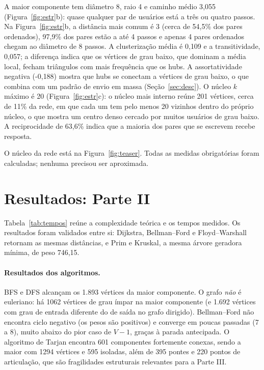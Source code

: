 \documentclass[sigconf]{webmedia}
\newcommand{\reciprocidade}{63{,}6\%}
\newcommand{\tamMaiorComp}{1.893}
\newcommand{\diametro}{8}
\newcommand{\raio}{4}
\newcommand{\caminhoMedio}{3{,}055}
\newcommand{\clustMedio}{0{,}109}
\newcommand{\transitividade}{0{,}057}
\newcommand{\coreMax}{20}
\newcommand{\assortatividade}{-0{,}188}
\newcommand{\nPontes}{395}
\newcommand{\nArticulacoes}{220}
\newcommand{\nSCC}{601}
\newcommand{\maiorSCC}{1294}
\newcommand{\grausImpares}{1062}
\newcommand{\pesoMST}{746{,}15}
\begin{document}
A maior componente tem diâmetro \diametro, raio \raio{} e caminho médio \caminhoMedio{} (Figura~\ref{fig:estr}b): quase qualquer par de usuários está a três ou quatro passos. Na Figura~\ref{fig:estr}b, a distância mais comum é 3 (cerca de 54,5\% dos pares ordenados), 97,9\% dos pares estão a até 4 passos e apenas 4 pares ordenados chegam ao diâmetro de \diametro{} passos. A clusterização média é \clustMedio{} e a transitividade, \transitividade{}; a diferença indica que os vértices de grau baixo, que dominam a média local, fecham triângulos com mais frequência que os hubs. A assortatividade negativa (\assortatividade{}) mostra que hubs se conectam a vértices de grau baixo, o que combina com um padrão de envio em massa (Seção~\ref{sec:desc}). O núcleo $k$ máximo é \coreMax{} (Figura~\ref{fig:estr}c): o núcleo mais interno reúne 201 vértices, cerca de 11\% da rede, em que cada um tem pelo menos 20 vizinhos dentro do próprio núcleo, o que mostra um centro denso cercado por muitos usuários de grau baixo. A reciprocidade de \reciprocidade{} indica que a maioria dos pares que se escrevem recebe resposta.

O núcleo da rede está na Figura~\ref{fig:teaser}. Todas as medidas obrigatórias foram calculadas; nenhuma precisou ser aproximada.

\FloatBarrier
\section{Resultados: Parte II}
Tabela~\ref{tab:tempos} reúne a complexidade teórica e os tempos medidos. Os resultados foram validados entre si: Dijkstra, Bellman--Ford e Floyd--Warshall retornam as mesmas distâncias, e Prim e Kruskal, a mesma árvore geradora mínima, de peso \pesoMST{}.

\paragraph{Resultados dos algoritmos.} BFS e DFS alcançam os \tamMaiorComp{} vértices da maior componente. O grafo \emph{não} é euleriano: há \grausImpares{} vértices de grau ímpar na maior componente (e 1.692 vértices com grau de entrada diferente do de saída no grafo dirigido). Bellman--Ford não encontra ciclo negativo (os pesos são positivos) e converge em poucas passadas (7 a 8), muito abaixo do pior caso de $V-1$, graças à parada antecipada. O algoritmo de Tarjan encontra \nSCC{} componentes fortemente conexas, sendo a maior com \maiorSCC{} vértices e 595 isoladas, além de \nPontes{} pontes e \nArticulacoes{} pontos de articulação, que são fragilidades estruturais relevantes para a Parte III.
\end{document}
